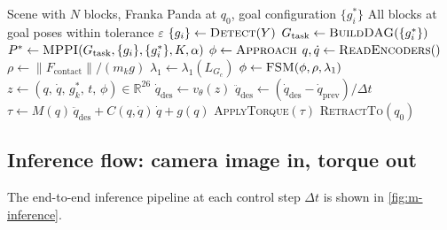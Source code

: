 \begin{algorithm}[H]
\caption{Block stacking: camera image in, torque out}
\label{alg:m-pipeline}
\begin{algorithmic}[1]
\Require Scene with $N$ blocks, Franka Panda at $q_0$,
  goal configuration $\{g_i^*\}$
\Ensure All blocks at goal poses within tolerance $\varepsilon$
\State $\{g_i\} \gets \textsc{Detect}(Y)$
\State $G_{\mathrm{task}} \gets \textsc{BuildDAG}(\{g_i^*\})$
\State $P^* \gets \textsc{MPPI}(G_{\mathrm{task}}, \{g_i\},
  \{g_i^*\}, K, \alpha)$
  \State $\phi \gets \textsc{Approach}$
    \State $q, \dot{q} \gets \textsc{ReadEncoders}()$
    \State $\rho \gets \|F_{\mathrm{contact}}\| / (m_k g)$
    \State $\lambda_1 \gets \lambda_1(L_{G_c})$
    \State $\phi \gets \textsc{FSM}(\phi, \rho, \lambda_1)$
    \State $z \gets (q,\, \dot{q},\, g_k^*,\, t,\, \phi)
      \in \mathbb{R}^{26}$
    \State $\dot{q}_{\mathrm{des}} \gets v_\theta(z)$
    \State $\ddot{q}_{\mathrm{des}} \gets
      (\dot{q}_{\mathrm{des}} - \dot{q}_{\mathrm{prev}})
      / \Delta t$
    \State $\tau \gets M(q)\,\ddot{q}_{\mathrm{des}}
      + C(q,\dot{q})\,\dot{q} + g(q)$
    \State \textsc{ApplyTorque}$(\tau)$
  \EndWhile
  \State \textsc{RetractTo}$(q_0)$
\EndFor
\end{algorithmic}
\end{algorithm}

\subsection{Inference flow: camera image in, torque out}

The end-to-end inference pipeline at each control step $\Delta t$
is shown in \cref{fig:m-inference}.

